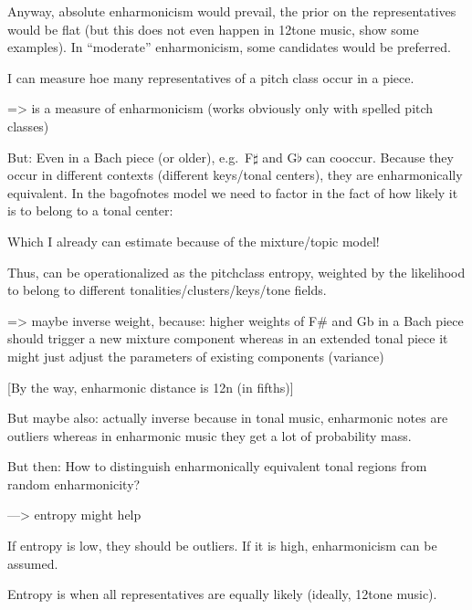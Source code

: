 \documentclass[letterpaper,10pt,english]{sphinxmanual}
\begin{document}
\sphinxAtStartPar
Anyway,  absolute enharmonicism would prevail, the prior on the
representatives would be flat (but this does not even happen in 12\sphinxhyphen{}tone
music, show some examples). In “moderate” enharmonicism, some candidates
would be preferred.

\sphinxAtStartPar
I can measure hoe many representatives of a pitch class occur in a
piece.

\sphinxAtStartPar
=\textgreater{}  is a measure of enharmonicism
(works obviously only with spelled pitch classes)

\sphinxAtStartPar
But: Even in a Bach piece (or older), e.g. F\(\sharp\) and
G\(\flat\) can co\sphinxhyphen{}occur. Because they occur in different contexts
(different keys/tonal centers), they are  enharmonically
equivalent. In the bag\sphinxhyphen{}of\sphinxhyphen{}notes model we need to factor in the fact of
how likely it is to belong to a tonal center:

\sphinxAtStartPar
Which I already can estimate because of the mixture/topic model!

\sphinxAtStartPar
Thus,  can be operationalized as the pitch\sphinxhyphen{}class
entropy, weighted by the likelihood to belong to different
tonalities/clusters/keys/tone fields.

\sphinxAtStartPar
=\textgreater{} maybe inverse weight, because: higher weights of F\# and Gb in a Bach
piece should trigger a new mixture component whereas in an extended
tonal piece it might just adjust the parameters of existing components
(variance)

\sphinxAtStartPar
{[}By the way, enharmonic distance is 12n (in fifths){]}

\sphinxAtStartPar
But maybe also: actually inverse because in tonal music, enharmonic
notes are outliers whereas in enharmonic music they get a lot of
probability mass.

\sphinxAtStartPar
But then: How to distinguish enharmonically equivalent tonal regions
from random enharmonicity?

\sphinxAtStartPar
—\textgreater{} entropy might help

\sphinxAtStartPar
If entropy is low, they should be outliers. If it is high, enharmonicism
can be assumed.

\sphinxAtStartPar
Entropy is  when all representatives are equally likely
(ideally, 12\sphinxhyphen{}tone music).
\end{document}
